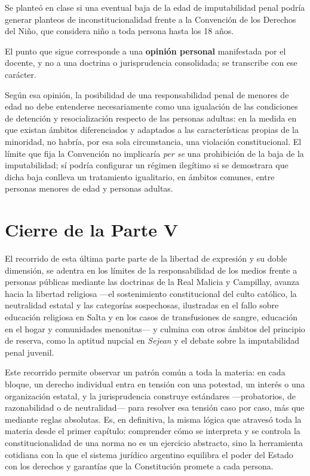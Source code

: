 \documentclass[12pt,oneside]{book}
\begin{document}
Se planteó en clase si una eventual baja de la edad de imputabilidad penal podría generar planteos de inconstitucionalidad frente a la Convención de los Derechos del Niño, que considera niño a toda persona hasta los 18 años.

\begin{note}
El punto que sigue corresponde a una \textbf{opinión personal} manifestada por el docente, y no a una doctrina o jurisprudencia consolidada; se transcribe con ese carácter.
\end{note}

Según esa opinión, la posibilidad de una responsabilidad penal de menores de edad no debe entenderse necesariamente como una igualación de las condiciones de detención y resocialización respecto de las personas adultas: en la medida en que existan ámbitos diferenciados y adaptados a las características propias de la minoridad, no habría, por esa sola circunstancia, una violación constitucional. El límite que fija la Convención no implicaría \emph{per se} una prohibición de la baja de la imputabilidad; sí podría configurar un régimen ilegítimo si se demostrara que dicha baja conlleva un tratamiento igualitario, en ámbitos comunes, entre personas menores de edad y personas adultas.

\section{Cierre de la Parte V}

El recorrido de esta última parte parte de la libertad de expresión y su doble dimensión, se adentra en los límites de la responsabilidad de los medios frente a personas públicas mediante las doctrinas de la Real Malicia y Campillay, avanza hacia la libertad religiosa ---el sostenimiento constitucional del culto católico, la neutralidad estatal y las categorías sospechosas, ilustradas en el fallo sobre educación religiosa en Salta y en los casos de transfusiones de sangre, educación en el hogar y comunidades menonitas--- y culmina con otros ámbitos del principio de reserva, como la aptitud nupcial en \emph{Sejean} y el debate sobre la imputabilidad penal juvenil.

Este recorrido permite observar un patrón común a toda la materia: en cada bloque, un derecho individual entra en tensión con una potestad, un interés o una organización estatal, y la jurisprudencia construye estándares ---probatorios, de razonabilidad o de neutralidad--- para resolver esa tensión caso por caso, más que mediante reglas absolutas. Es, en definitiva, la misma lógica que atravesó toda la materia desde el primer capítulo: comprender cómo se interpreta y se controla la constitucionalidad de una norma no es un ejercicio abstracto, sino la herramienta cotidiana con la que el sistema jurídico argentino equilibra el poder del Estado con los derechos y garantías que la Constitución promete a cada persona.
\end{document}
